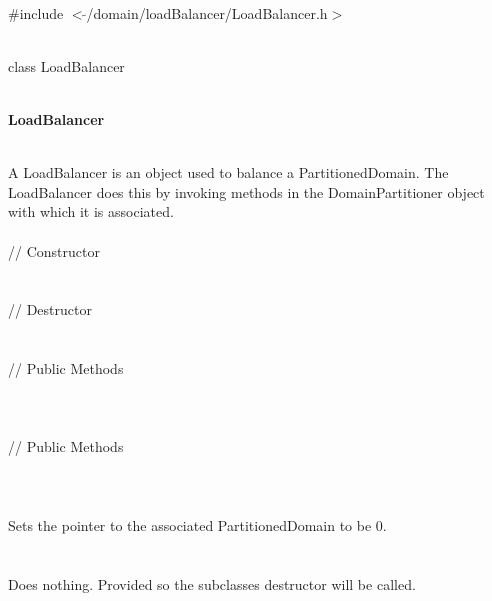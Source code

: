 
   \\
\#include $<\tilde{ }$/domain/loadBalancer/LoadBalancer.h$>$  


  \\
class LoadBalancer 


 \\
{\bf LoadBalancer} 



  \\
\indent A LoadBalancer is an object used to balance a
PartitionedDomain. The LoadBalancer does this by invoking methods in
the DomainPartitioner object with which it is associated. \\

  \\
\indent\indent  // Constructor  \\
\indent{}\\ \\
\indent\indent // Destructor  \\
\indent{}  \\ \\
\indent\indent // Public Methods  \\
\indent{} \\ 
\indent{} \\ \\
\indent\indent // Public Methods  \\
\indent{}\\


\\
\\ 
Sets the pointer to the associated PartitionedDomain to be $0$. \\

 \\
  \\ 
Does nothing. Provided so the subclasses destructor will be called. \\

